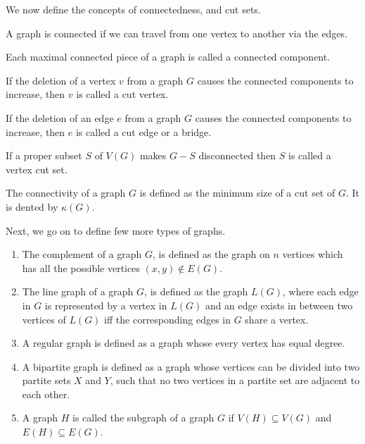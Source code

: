We now define the concepts of connectedness, and cut sets.\\
\begin{defn}
    A graph is connected if we can travel from one vertex to another via the edges.
\end{defn}

\begin{defn}
    Each maximal connected piece of a graph is called a connected component.
\end{defn}

\begin{defn}
    If the deletion of a vertex $v$ from a graph $G$ causes the connected components to increase, then $v$ is called a cut vertex. 
\end{defn}

\begin{defn}
    If the deletion of an edge $e$ from a graph $G$ causes the connected components to increase, then $e$ is called a cut edge or a bridge. 
\end{defn}

\begin{defn}
    If a proper subset $S$ of $V(G)$ makes $G-S$ disconnected then $S$ is called a vertex cut set.
\end{defn}

\begin{defn}
    The connectivity of a graph $G$ is defined as the minimum size of a cut set of $G$. It is dented by $\kappa(G)$.
\end{defn}

Next, we go on to define few more types of graphs.

\begin{enumerate}
    \item The complement of a graph $G$, is defined as the graph on $n$ vertices which has all the possible vertices $(x,y) \notin E(G)$.
    \item The line graph of a graph $G$, is defined as the graph $L(G)$, where each edge in $G$ is represented by a vertex in $L(G)$ and an edge exists in between two vertices of $L(G)$ iff the corresponding edges in $G$ share a vertex.
    \item A regular graph is defined as a graph whose every vertex has equal degree.
    \item A bipartite graph is defined as a graph whose vertices can be divided into two partite sets $X$ and $Y$, such that no two vertices in a partite set are adjacent to each other.
    \item A graph $H$ is called the subgraph of a graph $G$ if $V(H) \subseteq V(G)$ and $E(H) \subseteq E(G)$.
\end{enumerate}

